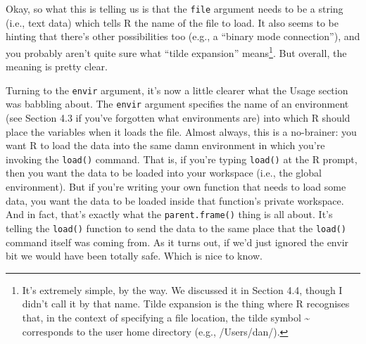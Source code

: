 \documentclass[
]{book}
\begin{document}
Okay, so what this is telling us is that the \texttt{file} argument needs to be a string (i.e., text data) which tells R the name of the ﬁle to load. It also seems to be hinting that there's other possibilities too (e.g., a ``binary mode connection''), and you probably aren't quite sure what ``tilde expansion'' means\footnote{It's extremely simple, by the way. We discussed it in Section 4.4, though I didn't call it by that name. Tilde expansion is the thing where R recognises that, in the context of specifying a ﬁle location, the tilde symbol \textasciitilde{} corresponds to the user home directory (e.g., /Users/dan/).}. But overall, the meaning is pretty clear.

Turning to the \texttt{envir} argument, it's now a little clearer what the Usage section was babbling about. The \texttt{envir} argument speciﬁes the name of an environment (see Section 4.3 if you've forgotten what environments are) into which R should place the variables when it loads the ﬁle. Almost always, this is a no-brainer: you want R to load the data into the same damn environment in which you're invoking the \texttt{load()} command. That is, if you're typing \texttt{load()} at the R prompt, then you want the data to be loaded into your workspace (i.e., the global environment). But if you're writing your own function that needs to load some data, you want the data to be loaded inside that function's private workspace. And in fact, that's exactly what the \texttt{parent.frame()} thing is all about. It's telling the \texttt{load()} function to send the data to the same place that the \texttt{load()} command itself was coming from. As it turns out, if we'd just ignored the envir bit we would have been totally safe. Which is nice to know.
\end{document}
